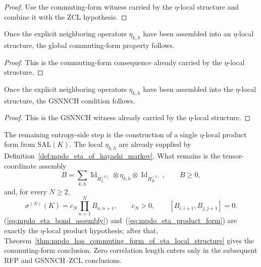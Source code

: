 \begin{proof}\leanok
    Use the commuting-form witness carried by the $\eta$-local structure and
    combine it with the ZCL hypothesis.
\end{proof}

\begin{theorem}
    \label{thm:mpdo_has_commuting_form_of_eta_local_structure}
    \leanok
    Once the explicit neighboring operators $\eta_{k,h}$ have been assembled
    into an $\eta$-local structure, the global commuting-form property follows.
\end{theorem}

\begin{proof}\leanok
    This is the commuting-form consequence already carried by the
    $\eta$-local structure.
\end{proof}

\begin{theorem}
    \label{thm:mpdo_is_gsnnch_of_eta_local_structure}
    \leanok
    Once the explicit neighboring operators $\eta_{k,h}$ have been assembled
    into the $\eta$-local structure, the GSNNCH condition follows.
\end{theorem}

\begin{proof}\leanok
    This is the GSNNCH witness already carried by the $\eta$-local structure.
\end{proof}

\begin{remark}
    The remaining entropy-side step is the construction of a single
    $\eta$-local product form from $\mathrm{SAL}(K)$. The local $\eta_{k,h}$
    are already supplied by
    Definition~\ref{def:mpdo_eta_of_hayashi_markov}. What remains is the
    tensor-coordinate assembly
    \begin{equation}\label{eq:mpdo_eta_bond_assembly}
        B=\sum_{k,h}
        \operatorname{Id}_{H_L^{(k)}}\otimes
        \eta_{k,h}\otimes
        \operatorname{Id}_{H_R^{(h)}},
        \qquad B\ge 0,
    \end{equation}
    and, for every $N\ge 2$,
    \begin{equation}\label{eq:mpdo_eta_product_form}
        \sigma^{(N)}(K)=c_N\prod_{n=1}^{N}B_{n,n+1},
        \qquad c_N>0,\qquad
        [B_{i,i+1},B_{j,j+1}]=0.
    \end{equation}
    (\ref{eq:mpdo_eta_bond_assembly}) and~(\ref{eq:mpdo_eta_product_form}) are
    exactly the $\eta$-local product hypothesis; after that,
    Theorem~\ref{thm:mpdo_has_commuting_form_of_eta_local_structure}
    gives the commuting-form conclusion. Zero correlation length enters only in
    the subsequent RFP and GSNNCH--ZCL conclusions.
\end{remark}

